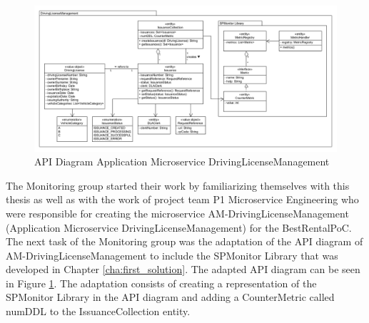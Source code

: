 \begin{figure}[tb]
	\centering
	\includegraphics[width=\textwidth]{figures/7.2_api_diagram_drivinglicensemanagement.png}
	\caption{API Diagram Application Microservice DrivingLicenseManagement}
	\label{fig:api_diagram_drivinglicensemanagement_p3}
\end{figure}

The Monitoring group started their work by familiarizing themselves with this thesis as well as with the work
of project team P1 Microservice Engineering who were responsible for creating the microservice
AM-DrivingLicenseManagement (Application Microservice DrivingLicenseManagement) for the BestRentalPoC.
The next task of the Monitoring group was the adaptation of the API diagram of AM-DrivingLicenseManagement
to include the SPMonitor Library that was developed in Chapter \ref{cha:first_solution}.
The adapted API diagram can be seen in Figure \ref{fig:api_diagram_drivinglicensemanagement_p3}.
The adaptation consists of creating a representation of the SPMonitor Library in the API diagram
and adding a CounterMetric called numDDL to the IssuanceCollection entity.

